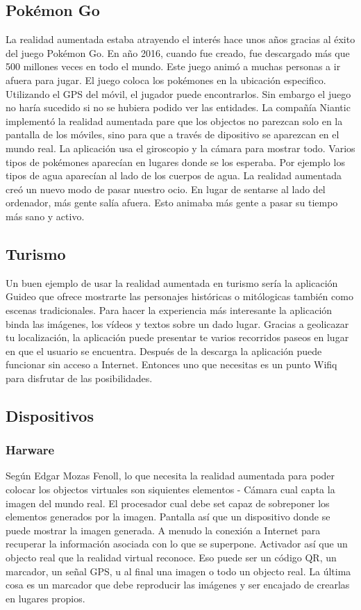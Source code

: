 \documentclass[a4paper,11pt]{scrartcl}
\begin{document}
\subsection{Pokémon Go}
La realidad aumentada estaba atrayendo el interés hace unos años gracias al éxito del juego Pokémon Go. En año 2016, cuando fue creado, fue descargado más que 500 millones veces en todo el mundo. Este juego animó a muchas personas a ir afuera para jugar. El juego coloca los pokémones en la ubicación especifico. Utilizando el GPS del móvil, el jugador puede encontrarlos. Sin embargo el juego no haría sucedido si no se hubiera podido ver las entidades. La compañía Niantic implementó la realidad aumentada pare que los objectos no parezcan solo en la pantalla de los móviles, sino para que a través de dipositivo se aparezcan en el mundo real. La aplicación usa el giroscopio y la cámara para mostrar todo. Varios tipos de pokémones aparecían en lugares donde se los esperaba. Por ejemplo los tipos de agua aparecían al lado de los cuerpos de agua. La realidad aumentada creó un nuevo modo de pasar nuestro ocio. En lugar de sentarse al lado del ordenador, más gente salía afuera. Esto animaba más gente a pasar su tiempo más sano y activo.

\subsection{Turismo}
Un buen ejemplo de usar la realidad aumentada en turismo sería la aplicación Guideo que ofrece mostrarte las personajes históricas o mitólogicas también como escenas tradicionales. Para hacer la experiencia más interesante la aplicación binda las imágenes, los vídeos y textos sobre un dado lugar. Gracias a geolicazar tu localización, la aplicación puede presentar te varios recorridos paseos en lugar en que el usuario se encuentra. Después de la descarga la aplicación puede funcionar sin acceso a Internet. Entonces uno que necesitas es un punto Wifiq para disfrutar de las posibilidades.


\subsection{Dispositivos}
\subsubsection{Harware}
Según Edgar Mozas Fenoll, lo que necesita la realidad aumentada para poder colocar los objectos virtuales son siquientes elementos -
Cámara cual capta la imagen del mundo real. El procesador cual debe set capaz de sobreponer los elementos generados por la imagen. Pantalla así que un dispositivo donde se puede mostrar la imagen generada. A menudo la conexión a Internet para recuperar la información asociada con lo que se superpone. Activador así que un objecto real que la realidad virtual reconoce. Eso puede ser un código QR, un marcador, un señal GPS, u al final una imagen o todo un objecto real. La última cosa es un marcador que debe reproducir las imágenes y ser encajado de crearlas en lugares propios.
%
\end{document}
